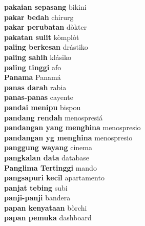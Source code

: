 \textbf{ pakaian sepasang  } bikini \\
\textbf{ pakar bedah  } chirurg \\
\textbf{ pakar perubatan  } dòkter \\
\textbf{ pakatan sulit  } kòmplòt \\
\textbf{ paling berkesan  } drástiko \\
\textbf{ paling sahih  } klásiko \\
\textbf{ paling tinggi  } afo \\
\textbf{ Panama  } Panamá \\
\textbf{ panas darah  } rabia \\
\textbf{ panas-panas  } cayente \\
\textbf{ pandai menipu  } bispou \\
\textbf{ pandang rendah  } menospresiá \\
\textbf{ pandangan yang menghina  } menospresio \\
\textbf{ pandangan yg menghina  } menospresio \\
\textbf{ panggung wayang  } cinema \\
\textbf{ pangkalan data  } database \\
\textbf{ Panglima Tertinggi  } mando \\
\textbf{ pangsapuri kecil  } apartamento \\
\textbf{ panjat tebing  } subi \\
\textbf{ panji-panji  } bandera \\
\textbf{ papan kenyataan  } bòrchi \\
\textbf{ papan pemuka  } dashboard \\
